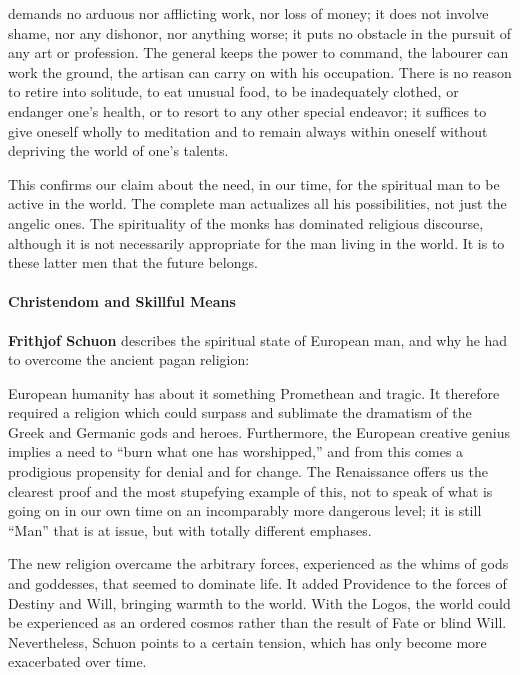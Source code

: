 \begin{quotex}
 demands no arduous nor afflicting work, nor loss of money; it does not involve shame, nor any dishonor, nor anything worse; it puts no obstacle in the pursuit of any art or profession. The general keeps the power to command, the labourer can work the ground, the artisan can carry on with his occupation. There is no reason to retire into solitude, to eat unusual food, to be inadequately clothed, or endanger one's health, or to resort to any other special endeavor; it suffices to give oneself wholly to meditation and to remain always within oneself without depriving the world of one's talents. 

\end{quotex}
This confirms our claim about the need, in our time, for the spiritual man to be active in the world. The complete man actualizes all his possibilities, not just the angelic ones. The spirituality of the monks has dominated religious discourse, although it is not necessarily appropriate for the man living in the world. It is to these latter men that the future belongs.

\paragraph{Christendom and Skillful Means}
\textbf{Frithjof Schuon} describes the spiritual state of European man, and why he had to overcome the ancient pagan religion:

\begin{quotex}
European humanity has about it something Promethean and tragic. It therefore required a religion which could surpass and sublimate the dramatism of the Greek and Germanic gods and heroes. Furthermore, the European creative genius implies a need to “burn what one has worshipped,” and from this comes a prodigious propensity for denial and for change. The Renaissance offers us the clearest proof and the most stupefying example of this, not to speak of what is going on in our own time on an incomparably more dangerous level; it is still “Man” that is at issue, but with totally different emphases.

\end{quotex}
The new religion overcame the arbitrary forces, experienced as the whims of gods and goddesses, that seemed to dominate life. It added Providence to the forces of Destiny and Will, bringing warmth to the world. With the Logos, the world could be experienced as an ordered cosmos rather than the result of Fate or blind Will. Nevertheless, Schuon points to a certain tension, which has only become more exacerbated over time.


